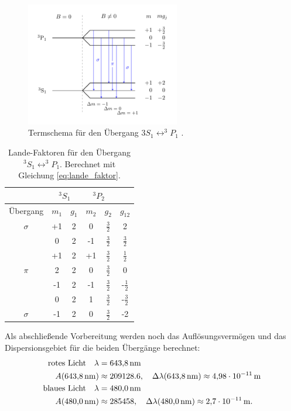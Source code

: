 \FloatBarrier
\begin{figure}[h]
  \centering
  \includegraphics[width=0.6\textwidth]{pics/termschema_blau.pdf}
  \caption{Termschema für den Übergang $3S_1\leftrightarrow ^3\!\!P_1$ \cite{luckyjosh}.}
  \label{fig: termschema_blau}
\end{figure}
\FloatBarrier

\FloatBarrier
\begin{table}

  \caption{Lande-Faktoren für den Übergang $^3S_1\leftrightarrow ^3\!\!P_1$. Berechnet mit Gleichung \eqref{eq:lande_faktor}.} %
	\label{tab:Lande_blau}
	\centering
  \renewcommand{\arraystretch}{1.2}
  \begin{tabular}{cccccc}
		\toprule
    & \multicolumn{2}{c}{${}^3S_1$}  & \multicolumn{2}{c}{${}^3P_2$} \\
		\midrule
    Übergang & $m_1$  & $g_{1}$ & $m_2$ & $ g_2$ & $g_{12}$\\
		\midrule
		$\sigma$ & +1 & 2 & 0 & $\frac{3}{2}$& 2\\
		& 0 & 2 & -1 & $\frac{3}{2}$ & $\frac{3}{2}$\\
		\midrule
		& +1 & 2 & +1 & $\frac{3}{2}$ & $\frac{1}{2}$\\
		$\pi$ & 2 & 2 & 0 & $\frac{3}{2}$ & 0 \\
		& -1 & 2 & -1 & $\frac{3}{2}$ & -$\frac{1}{2}$\\
		\midrule
		& 0 & 2 & 1 & $\frac{3}{2}$ & -$\frac{3}{2}$\\
		$\sigma$ & -1 & 2 & 0 & $\frac{3}{2}$& -2\\
		\bottomrule
	\end{tabular}
\end{table}
\FloatBarrier

Als abschließende Vorbereitung werden noch das Auflösungsvermögen und das Dispersionsgebiet
für die beiden Übergänge berechnet:
\begin{align}
\text{rotes Licht}\quad  \lambda&=\SI{643.8}{\nano\meter} \notag\\
   A(\SI{643.8}{\nano\meter})&\approx 209128.6, \quad \Delta \lambda(\SI{643.8}{\nano\meter})\approx\SI{4.98e-11}{\meter} \label{eq: auf_dis_rot} \\
\text{blaues Licht}  \quad \lambda&=\SI{480.0}{\nano\meter}\notag \\
 A(\SI{480.0}{\nano\meter})&\approx 285458, \quad \Delta \lambda(\SI{480.0}{\nano\meter})\approx \SI{2.7e-11}{\meter} \label{eq: auf_dis_blau}.
\end{align}


